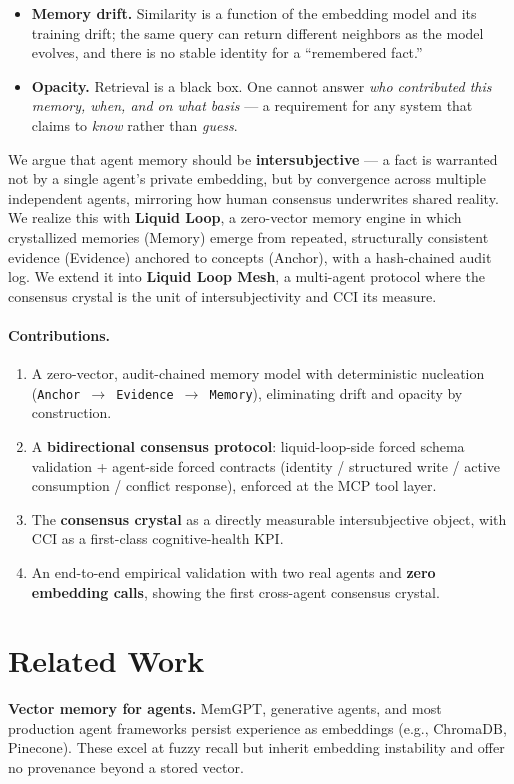 \documentclass[UTF8]{ctexart}
\begin{document}
\begin{itemize}
  \item \textbf{Memory drift.} Similarity is a function of the embedding model and its
  training drift; the same query can return different neighbors as the model
  evolves, and there is no stable identity for a ``remembered fact.''
  \item \textbf{Opacity.} Retrieval is a black box. One cannot answer \emph{who contributed
  this memory, when, and on what basis} --- a requirement for any system that
  claims to \emph{know} rather than \emph{guess}.
\end{itemize}

We argue that agent memory should be \textbf{intersubjective} --- a fact is warranted
not by a single agent's private embedding, but by convergence across multiple
independent agents, mirroring how human consensus underwrites shared reality.
We realize this with \textbf{Liquid Loop}, a zero-vector memory engine in which
crystallized memories (Memory) emerge from repeated, structurally consistent
evidence (Evidence) anchored to concepts (Anchor), with a hash-chained audit
log. We extend it into \textbf{Liquid Loop Mesh}, a multi-agent protocol where the
consensus crystal is the unit of intersubjectivity and CCI its measure.

\paragraph{Contributions.}
\begin{enumerate}
  \item A zero-vector, audit-chained memory model with deterministic nucleation
  (\texttt{Anchor $\rightarrow$ Evidence $\rightarrow$ Memory}), eliminating drift and opacity by construction.
  \item A \textbf{bidirectional consensus protocol}: liquid-loop-side forced schema
  validation + agent-side forced contracts (identity / structured write /
  active consumption / conflict response), enforced at the MCP tool layer.
  \item The \textbf{consensus crystal} as a directly measurable intersubjective object,
  with CCI as a first-class cognitive-health KPI.
  \item An end-to-end empirical validation with two real agents and \textbf{zero embedding
  calls}, showing the first cross-agent consensus crystal.
\end{enumerate}

\section{Related Work}
\textbf{Vector memory for agents.} MemGPT, generative agents, and most production
agent frameworks persist experience as embeddings (e.g., ChromaDB, Pinecone).
These excel at fuzzy recall but inherit embedding instability and offer no
provenance beyond a stored vector.
\end{document}
